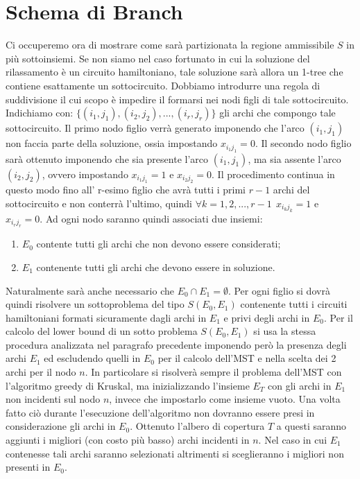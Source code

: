 \documentclass[
	article,			%
	12pt,				%
	oneside,			%
	a4paper,			%
	english,			%
	italian,				%
	sumario=tradicional,
	]{abntex2}
\begin{document}
\section{Schema di Branch}
Ci occuperemo ora di mostrare come sarà partizionata la regione ammissibile $S$ in più sottoinsiemi. Se non siamo nel caso fortunato in cui la soluzione del rilassamento è un circuito hamiltoniano, tale soluzione sarà allora un 1-tree che contiene esattamente un sottocircuito. Dobbiamo introdurre una regola di suddivisione il cui scopo è impedire il formarsi nei nodi figli di tale sottocircuito. Indichiamo con: $\{(i_1, j_1), (i_2,j_2),...,(i_r,j_r)\}$ gli archi che compongo tale sottocircuito. Il primo nodo figlio verrà generato imponendo che l'arco $(i_1,j_1)$ non faccia parte della soluzione, ossia impostando $x_{i_{1}j_{1}} = 0$. Il secondo nodo figlio sarà ottenuto imponendo che sia presente l'arco $(i_1,j_1)$, ma sia assente l'arco $(i_2,j_2)$, ovvero impostando $x_{i_{1}j_{1}} = 1$ e $x_{i_{2}j_{2}} = 0$. Il procedimento continua in questo modo fino all' r-esimo figlio che avrà tutti i primi $r-1$ archi del sottocircuito e non conterrà l'ultimo, quindi $\forall k = 1,2,...,r-1 \:\:x_{i_{k}j_{k}} = 1$ e $x_{i_{r}j_{r}} = 0$.
\newline
Ad ogni nodo saranno quindi associati due insiemi: 
\begin{enumerate}
    \item $E_0$ contente tutti gli archi che non devono essere considerati;
    \item $E_1$ contenente tutti gli archi che devono essere in soluzione.
\end{enumerate}
Naturalmente sarà anche necessario che $E_0 \cap E_1 = \emptyset$.
\newline
Per ogni figlio si dovrà quindi risolvere un sottoproblema del tipo $S(E_0, E_1)$ contenente tutti i circuiti hamiltoniani formati sicuramente dagli archi in $E_1$ e privi degli archi in $E_0$.
Per il calcolo del lower bound di un sotto problema $S(E_0, E_1)$ si usa la stessa procedura analizzata nel paragrafo precedente imponendo però la presenza degli archi $E_1$ ed escludendo quelli in $E_0$ per il calcolo dell'MST e nella scelta dei 2 archi per il nodo $n$.
In particolare si risolverà sempre il problema dell'MST con l'algoritmo greedy di Kruskal, ma inizializzando l'insieme $E_T$ con gli archi in $E_1$ non incidenti sul nodo $n$, invece che impostarlo come insieme vuoto. Una volta fatto ciò durante l'esecuzione dell'algoritmo non dovranno essere presi in considerazione gli archi in $E_0$. Ottenuto l'albero di copertura $T$ a questi saranno aggiunti i migliori (con costo più basso) archi incidenti in $n$. Nel caso in cui $E_1$ contenesse tali archi saranno selezionati altrimenti si sceglieranno i migliori non presenti in $E_0$. 
\end{document}
